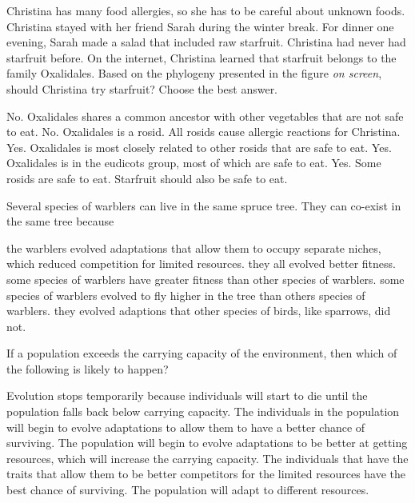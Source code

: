 \question
Christina has many food allergies, so she has to be careful about unknown foods.  Christina stayed with her friend Sarah during the winter break.  For dinner one evening, Sarah made a salad that included raw starfruit. Christina had never had starfruit before. On the internet, Christina learned that starfruit belongs to the family Oxalidales. Based on the phylogeny presented in the figure \textit{on screen}, should Christina try starfruit? Choose the best answer.

\begin{choices}
\correctchoice No. Oxalidales shares a common ancestor with other vegetables that are not safe to eat.%
\choice No. Oxalidales is a rosid. All rosids cause allergic reactions for Christina.%
\choice Yes. Oxalidales is most closely related to other rosids that are safe to eat.%
\choice Yes. Oxalidales is in the eudicots group, most of which are safe to eat.%
\choice Yes. Some rosids are safe to eat. Starfruit should also be safe to eat.%
\end{choices}


\question
Several species of warblers can live in the same spruce tree. They can co-exist in the same tree because

\begin{choices}
\correctchoice the warblers evolved adaptations that allow them to occupy separate niches, which reduced competition for limited resources.%
\choice they all evolved better fitness.%
\choice some species of warblers have greater fitness than other species of warblers.%
\choice some species of warblers evolved to fly higher in the tree than others species of warblers.%
\choice they evolved adaptions that other species of birds, like sparrows, did not.%
\end{choices}

\question
If a population exceeds the carrying capacity of the environment, then which of the following is likely to happen?

\begin{choices}
\choice Evolution stops temporarily because individuals will start to die until the population falls back below carrying capacity.%
\choice The individuals in the population will begin to evolve adaptations to allow them to have a better chance of surviving.%
\choice The population will begin to evolve adaptations to be better at getting resources, which will increase the carrying capacity.%
\correctchoice The individuals that have the traits that allow them to be better competitors for the limited resources have the best chance of surviving.%
\choice The population will adapt to different resources.%
\end{choices}

